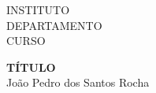 \documentclass[a4paper, 9pt]{article}
\begin{document}
	\begin{minipage}{.2\textwidth}
		\centering
	\end{minipage}
	\begin{minipage}{.8\textwidth}
		\vspace{.5cm}
		INSTITUTO\\
		DEPARTAMENTO\\ 
		CURSO\\
	\end{minipage}

	\begin{center}
		\Large{\bf{TÍTULO}}	\\
		\vspace{.5cm}
		João Pedro dos Santos Rocha
	\end{center}
	
	 \begin{abstract}
		 <+>
	 \end{abstract}
\end{document}
